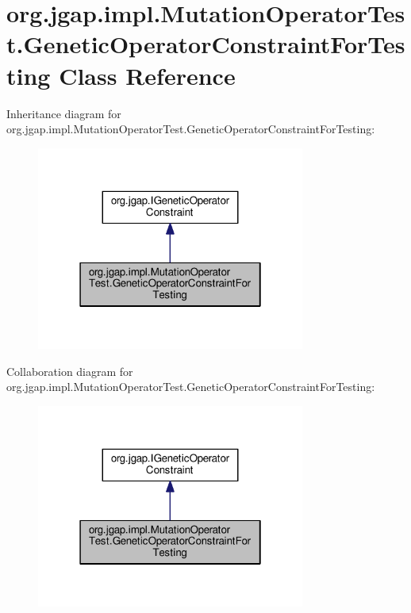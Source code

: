 \hypertarget{classorg_1_1jgap_1_1impl_1_1_mutation_operator_test_1_1_genetic_operator_constraint_for_testing}{\section{org.\-jgap.\-impl.\-Mutation\-Operator\-Test.\-Genetic\-Operator\-Constraint\-For\-Testing Class Reference}
\label{classorg_1_1jgap_1_1impl_1_1_mutation_operator_test_1_1_genetic_operator_constraint_for_testing}
}


Inheritance diagram for org.\-jgap.\-impl.\-Mutation\-Operator\-Test.\-Genetic\-Operator\-Constraint\-For\-Testing\-:
\nopagebreak
\begin{figure}[H]
\begin{center}
\leavevmode
\includegraphics[width=250pt]{classorg_1_1jgap_1_1impl_1_1_mutation_operator_test_1_1_genetic_operator_constraint_for_testing__inherit__graph}
\end{center}
\end{figure}


Collaboration diagram for org.\-jgap.\-impl.\-Mutation\-Operator\-Test.\-Genetic\-Operator\-Constraint\-For\-Testing\-:
\nopagebreak
\begin{figure}[H]
\begin{center}
\leavevmode
\includegraphics[width=250pt]{classorg_1_1jgap_1_1impl_1_1_mutation_operator_test_1_1_genetic_operator_constraint_for_testing__coll__graph}
\end{center}
\end{figure}
